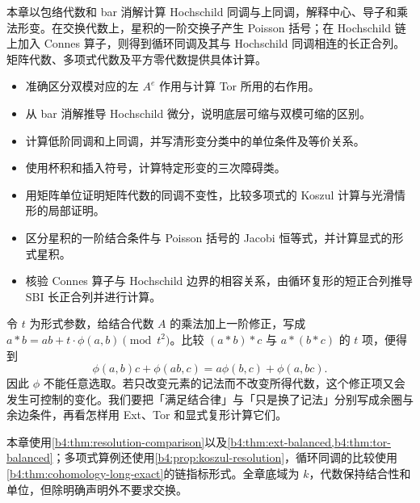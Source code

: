 

\begin{chapterabstract}
	本章以包络代数和 bar 消解计算 Hochschild 同调与上同调，解释中心、导子和乘法形变。在交换代数上，星积的一阶交换子产生 Poisson 括号；在 Hochschild 链上加入 Connes 算子，则得到循环同调及其与 Hochschild 同调相连的长正合列。矩阵代数、多项式代数及平方零代数提供具体计算。
\end{chapterabstract}

\begin{learninggoals}
	\begin{itemize}
		\item 准确区分双模对应的左 \(A^e\) 作用与计算 Tor 所用的右作用。
		\item 从 bar 消解推导 Hochschild 微分，说明底层可缩与双模可缩的区别。
		\item 计算低阶同调和上同调，并写清形变分类中的单位条件及等价关系。
		\item 使用杯积和插入符号，计算特定形变的三次障碍类。
		\item 用矩阵单位证明矩阵代数的同调不变性，比较多项式的 Koszul 计算与光滑情形的局部证明。
		\item 区分星积的一阶结合条件与 Poisson 括号的 Jacobi 恒等式，并计算显式的形式星积。
		\item 核验 Connes 算子与 Hochschild 边界的相容关系，由循环复形的短正合列推导 SBI 长正合列并进行计算。
	\end{itemize}
\end{learninggoals}

令 \(t\) 为形式参数，给结合代数 \(A\) 的乘法加上一阶修正，写成 \(a*b=ab+t\cdot\phi(a,b)\pmod{t^2}\)。比较 \((a*b)*c\) 与 \(a*(b*c)\) 的 \(t\) 项，便得到
\[
	\phi(a,b)c+\phi(ab,c)=a\phi(b,c)+\phi(a,bc).
\]
因此 \(\phi\) 不能任意选取。若只改变元素的记法而不改变所得代数，这个修正项又会发生可控制的变化。我们要把「满足结合律」与「只是换了记法」分别写成余圈与余边条件，再看怎样用 Ext、Tor 和显式复形计算它们。

\ProseParagraphBreak
本章使用\cref{b4:thm:resolution-comparison}以及\cref{b4:thm:ext-balanced,b4:thm:tor-balanced}；多项式算例还使用\cref{b4:prop:koszul-resolution}，循环同调的比较使用\cref{b4:thm:cohomology-long-exact}的链指标形式。全章底域为 \(k\)，代数保持结合性和单位，但除明确声明外不要求交换。


